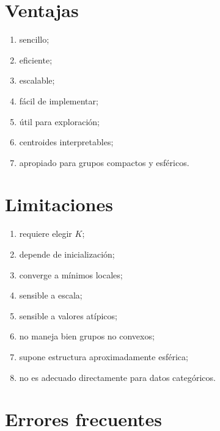 \documentclass[
  spanish,
  10.5pt,
  letterpaper,
  DIV=11,
  numbers=noendperiod,
  oneside,
  open=any]{scrreprt}
\providecommand{\tightlist}{%
  \setlength{\itemsep}{0pt}\setlength{\parskip}{0pt}}
\theoremstyle{definition}
\theoremstyle{definition}
\theoremstyle{plain}
\theoremstyle{remark}
\begin{document}
\section*{Ventajas}\label{ventajas-5}


\begin{enumerate}
\def\labelenumi{\arabic{enumi}.}
\tightlist
\item
  sencillo;
\item
  eficiente;
\item
  escalable;
\item
  fácil de implementar;
\item
  útil para exploración;
\item
  centroides interpretables;
\item
  apropiado para grupos compactos y esféricos.
\end{enumerate}

\section*{Limitaciones}\label{limitaciones-5}


\begin{enumerate}
\def\labelenumi{\arabic{enumi}.}
\tightlist
\item
  requiere elegir \(K\);
\item
  depende de inicialización;
\item
  converge a mínimos locales;
\item
  sensible a escala;
\item
  sensible a valores atípicos;
\item
  no maneja bien grupos no convexos;
\item
  supone estructura aproximadamente esférica;
\item
  no es adecuado directamente para datos categóricos.
\end{enumerate}

\section*{Errores frecuentes}\label{errores-frecuentes-16}

\end{document}
